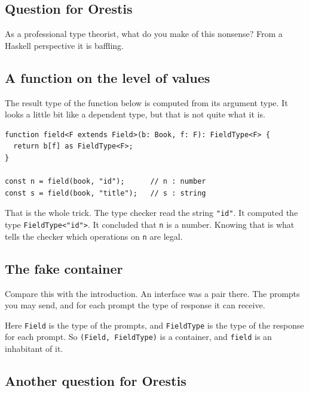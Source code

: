 \documentclass[11pt,a4paper]{article}
\begin{document}
\begin{pinkbox}
\begin{orestisbox}
\subsection{Question for Orestis}

As a professional type theorist, what do you make of this nonsense? From a Haskell perspective it
is baffling.
\end{orestisbox}

\newpage

\subsection{A function on the level of values}

The result type of the function below is computed from its argument type. It looks a little bit
like a dependent type, but that is not quite what it is.

\begin{lstlisting}[language=TS]
function field<F extends Field>(b: Book, f: F): FieldType<F> {
  return b[f] as FieldType<F>;
}

const n = field(book, "id");      // n : number
const s = field(book, "title");   // s : string
\end{lstlisting}

That is the whole trick. The type checker read the string \texttt{"id"}. It computed the type
\texttt{FieldType<"id">}. It concluded that \texttt{n} is a number. Knowing that is what tells the
checker which operations on \texttt{n} are legal.

\subsection{The fake container}

Compare this with the introduction. An interface was a pair there. The prompts you may send, and
for each prompt the type of response it can receive.

Here \texttt{Field} is the type of the prompts, and \texttt{FieldType} is the type of the response
for each prompt. So \texttt{(Field, FieldType)} is a container, and \texttt{field} is an inhabitant
of it.

\begin{orestisbox}
\subsection{Another question for Orestis}


\end{orestisbox}
\end{pinkbox}
\end{document}
